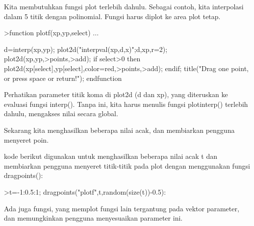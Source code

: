 \documentclass[a4paper,10pt]{article}
\begin{document}
\begin{eulernotebook}
\begin{eulercomment}
\begin{eulercomment}
\begin{eulercomment}
Kita membutuhkan fungsi plot terlebih dahulu. Sebagai contoh, kita
interpolasi dalam 5 titik dengan polinomial. Fungsi harus diplot ke
area plot tetap.
\end{eulercomment}
\begin{eulerprompt}
>function plotf(xp,yp,select) ...
\end{eulerprompt}
\begin{eulerudf}
    d=interp(xp,yp);
    plot2d("interpval(xp,d,x)";d,xp,r=2);
    plot2d(xp,yp,>points,>add);
    if select>0 then
      plot2d(xp[select],yp[select],color=red,>points,>add);
    endif;
    title("Drag one point, or press space or return!");
  endfunction
\end{eulerudf}
\begin{eulercomment}
Perhatikan parameter titik koma di plot2d (d dan xp), yang diteruskan
ke evaluasi fungsi interp(). Tanpa ini, kita harus menulis fungsi
plotinterp() terlebih dahulu, mengakses nilai secara global.

Sekarang kita menghasilkan beberapa nilai acak, dan membiarkan
pengguna menyeret poin.

kode berikut digunakan untuk menghasilkan beberapa nilai acak t dan
membiarkan pengguna menyeret titik-titik pada plot dengan menggunakan
fungsi dragpoints():
\end{eulercomment}
\begin{eulerprompt}
>t=-1:0.5:1; dragpoints("plotf",t,random(size(t))-0.5):
\end{eulerprompt}
\begin{eulercomment}
Ada juga fungsi, yang memplot fungsi lain tergantung pada vektor
parameter, dan memungkinkan pengguna menyesuaikan parameter ini.


\end{eulercomment}
\end{eulercomment}
\end{eulercomment}
\end{eulernotebook}
\end{document}
